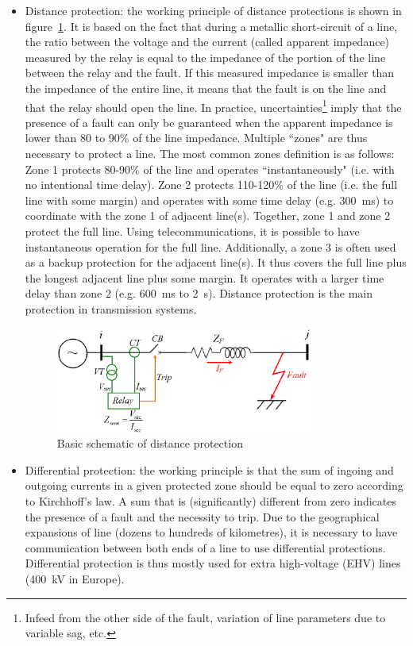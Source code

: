 \begin{itemize}
    \item Distance protection: the working principle of distance protections is shown in figure~\ref{fig:distanceFigure}. It is based on the fact that during a metallic short-circuit of a line, the ratio between the voltage and the current (called apparent impedance) measured by the relay is equal to the impedance of the portion of the line between the relay and the fault. If this measured impedance is smaller than the impedance of the entire line, it means that the fault is on the line and that the relay should open the line. In practice, uncertainties\footnote{Infeed from the other side of the fault, variation of line parameters due to variable sag, etc.} imply that the presence of a fault can only be guaranteed when the apparent impedance is lower than 80 to 90\% of the line impedance. Multiple ``zones" are thus necessary to protect a line. The most common zones definition is as follows: Zone 1 protects 80-90\% of the line and operates ``instantaneously" (i.e. with no intentional time delay). Zone 2 protects 110-120\% of the line (i.e. the full line with some margin) and operates with some time delay (e.g. 300~ms) to coordinate with the zone 1 of adjacent line(s). Together, zone 1 and zone 2 protect the full line. Using telecommunications, it is possible to have instantaneous operation for the full line. Additionally, a zone 3 is often used as a backup protection for the adjacent line(s). It thus covers the full line plus the longest adjacent line plus some margin. It operates with a larger time delay than zone 2 (e.g. 600~ms to 2~s). Distance protection is the main protection in transmission systems.
\begin{figure}
    \centering
    \includegraphics[width = 0.8\textwidth]{Figs/Distance.png}
    \caption{Basic schematic of distance protection~\cite{distanceFigure}}
    \label{fig:distanceFigure}
\end{figure}

    \item Differential protection: the working principle is that the sum of ingoing and outgoing currents in a given protected zone should be equal to zero according to Kirchhoff's law. A sum that is (significantly) different from zero indicates the presence of a fault and the necessity to trip. Due to the geographical expansions of line (dozens to hundreds of kilometres), it is necessary to have communication between both ends of a line to use differential protections. Differential protection is thus mostly used for extra high-voltage (EHV) lines (400~kV in Europe).


\end{itemize}
